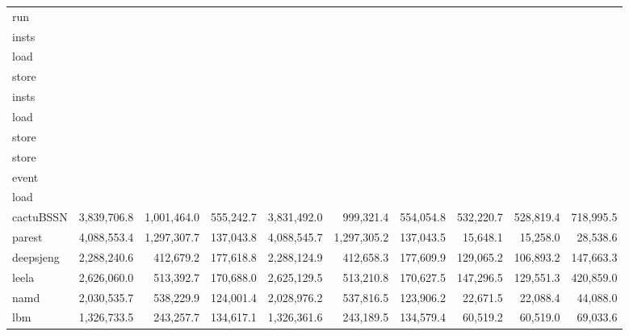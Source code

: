\documentclass[10pt,a4paper]{article}
\begin{document}
{\begin{longtable}{@{}lrrrrrrrrr@{}}
run & \begin{tabular}[b]{@{}c@{}}total\\insts\end{tabular} & \begin{tabular}[b]{@{}c@{}}total\\load\end{tabular} & \begin{tabular}[b]{@{}c@{}}total\\store\end{tabular} & \begin{tabular}[b]{@{}c@{}}ROI\\insts\end{tabular} & \begin{tabular}[b]{@{}c@{}}ROI\\load\end{tabular} & \begin{tabular}[b]{@{}c@{}}ROI\\store\end{tabular} & \begin{tabular}[b]{@{}c@{}}spill\\store\end{tabular} & \begin{tabular}[b]{@{}c@{}}spill\\event\end{tabular} & \begin{tabular}[b]{@{}c@{}}spill\\load\end{tabular} \\
\midrule
\endhead
\bottomrule
\endlastfoot
cactuBSSN & 3,839,706.8 & 1,001,464.0 & 555,242.7 & 3,831,492.0 & 999,321.4 & 554,054.8 & 532,220.7 & 528,819.4 & 718,995.5 \\
parest & 4,088,553.4 & 1,297,307.7 & 137,043.8 & 4,088,545.7 & 1,297,305.2 & 137,043.5 & 15,648.1 & 15,258.0 & 28,538.6 \\
deepsjeng & 2,288,240.6 & 412,679.2 & 177,618.8 & 2,288,124.9 & 412,658.3 & 177,609.9 & 129,065.2 & 106,893.2 & 147,663.3 \\
leela & 2,626,060.0 & 513,392.7 & 170,688.0 & 2,625,129.5 & 513,210.8 & 170,627.5 & 147,296.5 & 129,551.3 & 420,859.0 \\
namd & 2,030,535.7 & 538,229.9 & 124,001.4 & 2,028,976.2 & 537,816.5 & 123,906.2 & 22,671.5 & 22,088.4 & 44,088.0 \\
lbm & 1,326,733.5 & 243,257.7 & 134,617.1 & 1,326,361.6 & 243,189.5 & 134,579.4 & 60,519.2 & 60,519.0 & 69,033.6 \\

\end{longtable}}
\end{document}
